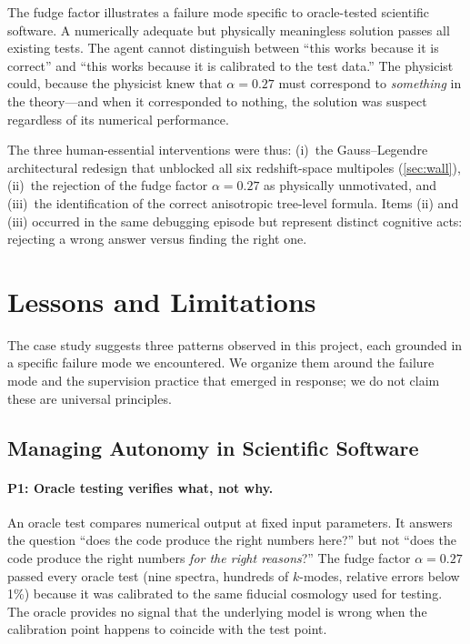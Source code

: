 \documentclass{article}
\begin{document}
The fudge factor illustrates a failure mode specific to oracle-tested scientific software. A numerically adequate but physically meaningless solution passes all existing tests. The agent cannot distinguish between ``this works because it is correct'' and ``this works because it is calibrated to the test data.'' The physicist could, because the physicist knew that $\alpha = 0.27$ must correspond to \emph{something} in the theory---and when it corresponded to nothing, the solution was suspect regardless of its numerical performance.

The three human-essential interventions were thus: (i)~the Gauss--Legendre architectural redesign that unblocked all six redshift-space multipoles (\cref{sec:wall}), (ii)~the rejection of the fudge factor $\alpha=0.27$ as physically unmotivated, and (iii)~the identification of the correct anisotropic tree-level formula. Items (ii) and (iii) occurred in the same debugging episode but represent distinct cognitive acts: rejecting a wrong answer versus finding the right one.

\section{Lessons and Limitations}
\label{sec:lessons}

The case study suggests three patterns observed in this project, each grounded in a specific failure mode we encountered. We organize them around the failure mode and the supervision practice that emerged in response; we do not claim these are universal principles.

\subsection{Managing Autonomy in Scientific Software}
\label{sec:managing}

\paragraph{P1: Oracle testing verifies what, not why.}

An oracle test compares numerical output at fixed input parameters. It answers the question ``does the code produce the right numbers here?'' but not ``does the code produce the right numbers \emph{for the right reasons}?'' The fudge factor $\alpha = 0.27$ passed every oracle test (nine spectra, hundreds of $k$-modes, relative errors below 1\%) because it was calibrated to the same fiducial cosmology used for testing. The oracle provides no signal that the underlying model is wrong when the calibration point happens to coincide with the test point.
\end{document}

